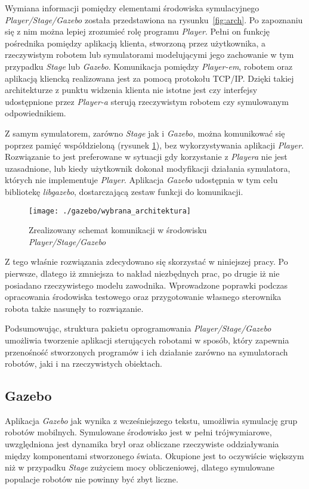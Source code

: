 	Wymiana informacji pomiędzy elementami środowiska symulacyjnego \textit{Player/Stage/Gazebo} została przedstawiona na 
	rysunku~\ref{fig:arch}.
	Po zapoznaniu się z nim można lepiej zrozumieć rolę programu \textit{Player}. Pełni on funkcję pośrednika pomiędzy aplikacją klienta, stworzoną przez użytkownika,
	a rzeczywistym robotem lub symulatorami modelującymi jego zachowanie w tym przypadku \textit{Stage} lub \textit{Gazebo}. 
	Komunikacja pomiędzy \textit{Player-em}, robotem oraz aplikacją kliencką realizowana jest za pomocą protokołu TCP/IP.
	Dzięki takiej architekturze z punktu widzenia klienta nie istotne jest czy interfejsy udostępnione przez \textit{Player-a} sterują rzeczywistym robotem czy symulowanym odpowiednikiem.
	
	Z samym symulatorem, zarówno \textit{Stage} jak i \textit{Gazebo}, można komunikować się poprzez pamięć współdzieloną (rysunek \ref{fig:wybrana_arch}), bez wykorzystywania aplikacji \textit{Player}. Rozwiązanie to jest 
	preferowane w sytuacji gdy korzystanie z \textit{Playera} nie jest uzasadnione, lub kiedy użytkownik dokonał modyfikacji działania symulatora, których nie implementuje \textit{Player}. 
	Aplikacja \textit{Gazebo} udostępnia w tym celu  bibliotekę \textit{libgazebo}, dostarczającą zestaw funkcji do komunikacji.
	\begin{figure}[h]
	\centering
	\texttt{[image: ./gazebo/wybrana\_architektura]}
	\caption{Zrealizowany schemat komunikacji w środowisku \textit{Player/Stage/Gazebo} \label{fig:wybrana_arch}}
	\end{figure}
	Z tego właśnie rozwiązania zdecydowano się skorzystać w niniejszej pracy. Po pierwsze, dlatego iż zmniejsza to nakład niezbędnych prac, po drugie iż nie posiadano rzeczywistego modelu
	zawodnika. Wprowadzone poprawki podczas opracowania środowiska testowego oraz przygotowanie własnego sterownika robota także nasunęły to rozwiązanie.

	Podsumowując, struktura pakietu oprogramowania \mbox{\textit{Player/Stage/Gazebo}} umożliwia tworzenie aplikacji sterujących robotami w sposób,
	który zapewnia przenośność stworzonych programów i ich działanie zarówno na symulatorach robotów, jaki i na rzeczywistych obiektach.
	
 	\subsection{Gazebo}
 	
 	Aplikacja \textit{Gazebo} jak wynika z wcześniejszego tekstu, umożliwia symulację grup robotów mobilnych. Symulowane
 	środowisko jest w pełni trójwymiarowe, uwzględniona jest dynamika brył oraz obliczane rzeczywiste oddziaływania między komponentami stworzonego świata.
	Okupione jest to oczywiście większym niż w przypadku \textit{Stage} zużyciem mocy obliczeniowej, dlatego symulowane populacje robotów nie powinny być zbyt liczne.
 	 	
